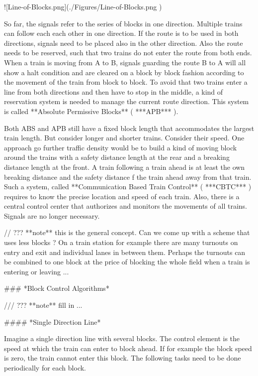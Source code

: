 ![Line-of-Blocks.png](./Figures/Line-of-Blocks.png )

So far, the signals refer to the series of blocks in one direction. Multiple trains can follow each each other in one direction. If the route is to be used in both directions, signals need to be placed also in the other direction. Also the route needs to be reserved, such that two trains do not enter the route from both ends. When a train is moving from A to B, signals guarding the route B to A will all show a halt condition and are cleared on a block by block fashion according to the movement of the train from block to block. To avoid that two trains enter a line from both directions and then have to stop in the middle, a kind of reservation system is needed to manage the current route direction. This system is called **Absolute Permissive Blocks** ( ***APB*** ).

Both ABS and APB still have a fixed block length that accommodates the largest train length. But consider longer and shorter trains. Consider their speed. One approach go further traffic density would be to build a kind of moving block around the trains with a safety distance length at the rear and a breaking distance length at the front. A train following a train ahead is at least the own breaking distance and the safety distance f the train ahead away from that train. Such a system, called **Communication Based Train Control** ( ***CBTC*** ) requires to know the precise location and speed of each train. Also, there is a central control center that authorizes and monitors the movements of all trains. Signals are no longer necessary.

// ??? **note** this is the general concept. Can we come up with a scheme that uses less blocks ? On a train station for example there are many turnouts on entry and exit and individual lanes in between them. Perhaps the turnouts can be combined to one block at the price of blocking the whole field when a train is entering or leaving ...

### *Block Control Algorithms*

/// ??? **note** fill in ...

#### *Single Direction Line*

Imagine a single direction line with several blocks. The control element is the speed at which the train can enter to block ahead. If for example the block speed is zero, the train cannot enter this block. The following tasks need to be done periodically for each block.

